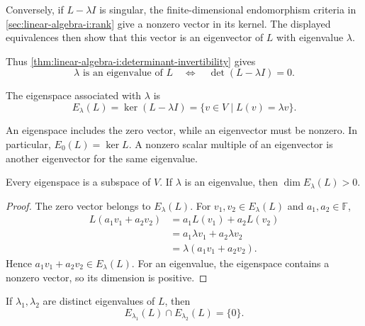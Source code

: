 Conversely, if \(L-\lambda I\) is singular, the finite-dimensional
endomorphism criteria in \autoref{sec:linear-algebra-i:rank} give a nonzero
vector in its kernel. The displayed equivalences then show that this vector
is an eigenvector of \(L\) with eigenvalue \(\lambda\).

Thus
\autoref{thm:linear-algebra-i:determinant-invertibility} gives
\begin{equation}
  \lambda\text{ is an eigenvalue of }L
  \quad\Longleftrightarrow\quad \det(L-\lambda I)=0.
  \label{eq:linear-algebra-i:eigenvalue-determinant-criterion}
\end{equation}

\begin{definition}
  The eigenspace associated with \(\lambda\) is
  \[
    E_\lambda(L)=\ker(L-\lambda I)
      =\{v\in V\mid L(v)=\lambda v\}.
  \]
\end{definition}

An eigenspace includes the zero vector, while an eigenvector must be
nonzero. In particular, \(E_0(L)=\ker L\). A nonzero scalar multiple
of an eigenvector is another eigenvector for the same eigenvalue.

\begin{proposition}
  \label{thm:linear-algebra-i:eigenspaces-are-subspaces}
  Every eigenspace is a subspace of \(V\). If \(\lambda\) is an
  eigenvalue, then \(\dim E_\lambda(L)>0\).
\end{proposition}

\begin{proof}
  The zero vector belongs to \(E_\lambda(L)\). For
  \(v_1,v_2\in E_\lambda(L)\) and \(a_1,a_2\in\mathbb F\),
  \begin{align*}
    L(a_1v_1+a_2v_2)
      &=a_1L(v_1)+a_2L(v_2)\\
      &=a_1\lambda v_1+a_2\lambda v_2\\
      &=\lambda(a_1v_1+a_2v_2).
  \end{align*}
  Hence \(a_1v_1+a_2v_2\in E_\lambda(L)\). For an eigenvalue,
  the eigenspace contains a nonzero vector, so its dimension is positive.
\end{proof}

\begin{proposition}
  \label{thm:linear-algebra-i:distinct-eigenspaces-intersection}
  If \(\lambda_1,\lambda_2\) are distinct eigenvalues of \(L\), then
  \[
    E_{\lambda_1}(L)\cap E_{\lambda_2}(L)=\{0\}.
  \]
\end{proposition}

